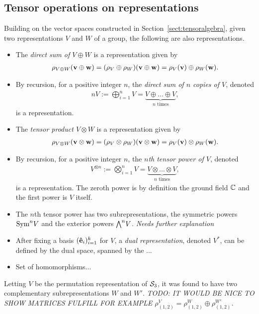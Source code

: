 \subsection{Tensor operations on representations}\label{sect:tensorrepr}

Building on the vector spaces constructed in Section~\ref{sect:tensoralgebra}, given two representations $V$ and $W$ of a group, the following are also representations.

\begin{itemize}
	\item The \emph{direct sum of $V \oplus W$} is a representation given by 
	\begin{align*}
		\rho_{V \oplus W}(\mathbf{v} \oplus \mathbf{w}) = (\rho_V \oplus \rho_W)(\mathbf{v} \oplus \mathbf{w}) = \rho_V(\mathbf{v}) \oplus \rho_W(\mathbf{w}).
	\end{align*}
	
	\item By recursion, for a positive integer $n$, the \emph{direct sum of $n$ copies of $V$}, denoted
	\begin{align*}
		nV := \bigoplus_{i=1}^n V = \underset{\text{$n$ times}}{\underbrace{V \oplus \dots \oplus V}},
	\end{align*}
	is a representation.
	
	\item The \emph{tensor product $V \otimes W$} is a representation given by
	\begin{align*}
		\rho_{V \otimes W}(\mathbf{v} \otimes \mathbf{w}) = (\rho_V \otimes \rho_W)(\mathbf{v} \otimes \mathbf{w}) = \rho_V(\mathbf{v}) \otimes \rho_W(\mathbf{w}).
	\end{align*}
	
	\item By recursion, for a positive integer $n$, the \emph{$n$th tensor power of $V$}, denoted
	\begin{align*}
		V^{\otimes n} := \bigotimes_{i=1}^n V = \underset{\text{$n$ times}}{\underbrace{V \otimes \dots \otimes V}},
	\end{align*}
	is a representation. The zeroth power is by definition the ground field $\mathbb{C}$ and the first power is $V$ itself.
	
	\item The $n$th tensor power has two subrepresentations, the symmetric powers $\text{Sym}^n V$ and the exterior powers ${\bigwedge}^n V$. \textit{Needs further explanation}
	
	\item After fixing a basis $(\mathbf{\hat{e}}_i)_{i=1}^k$ for $V$, a \emph{dual representation}, denoted $V^*$, can be defined by the dual space, spanned by the ...
	
	\item Set of homomorphisms...
\end{itemize}


\begin{example}
	Letting $V$ be the permutation representation of $\mathcal{S}_3$, it was found to have two complementary subrepresentations $W$ and $W'$. \textit{TODO: IT WOULD BE NICE TO SHOW MATRICES FULFILL FOR EXAMPLE $\rho_{(1,2)}^V = \rho_{(1,2)}^W \oplus \rho_{(1,2)}^{W'}$.}
\end{example}
